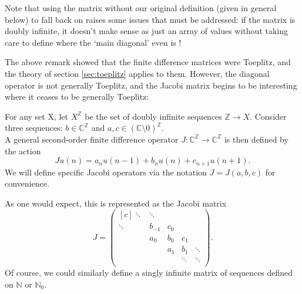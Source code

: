 \documentclass[../main.tex]{subfiles}
\begin{document}
Note that using the matrix without our original definition (given in general
below) to fall back on raises some issues that must be addressed: if the matrix
is doubly infinite, it doesn't make sense as just an array of values without
taking care to define where the `main diagonal' even is \cite{lindner2013where}!

The above remark showed that the finite difference matrices were Toeplitz, and the
theory of section \ref{sec:toeplitz} applies to them. However, the diagonal
operator is not generally Toeplitz, and the Jacobi matrix begins to be interesting where
it ceases to be generally Toeplitz:

\begin{definition}
  For any set X, let $X^\mathbb{Z}$ be the set of doubly infinite sequences $\mathbb{Z}
  \rightarrow X$. Consider three sequences:
  $b \in \mathbb{C}^\mathbb{Z}$
  and $a, c \in (\mathbb{C} \setminus 0)^\mathbb{Z}$.\\
  A general second-order finite difference operator 
  $J: \mathbb{C}^\mathbb{Z} \rightarrow \mathbb{C}^\mathbb{Z}$
  is then defined by the action 
  \begin{equation}
  \label{eqn:2efde}
    Ju (n) = a_n u(n-1) + b_n u(n) + c_{n+1} u(n+1).
  \end{equation}
  We will define specific Jacobi operators via the notation $J = J(a, b, c)$
  for convenience.
\end{definition}

As one would expect, this is represented as the Jacobi matrix
  $$ 
  J = 
  \begin{pmatrix*}[c]
    \ddots & \ddots & & & \\
    \ddots & b_{-1} & c_0 & & \\
    & a_0 & b_0 & c_1 & \\
    & & a_1 & b_1 & \ddots \\
    & & & \ddots & \ddots \\
  \end{pmatrix*}.
  $$
Of course, we could similarly define a singly infinite matrix of sequences defined on $\mathbb{N}$
or $\mathbb{N}_0$.
\end{document}
